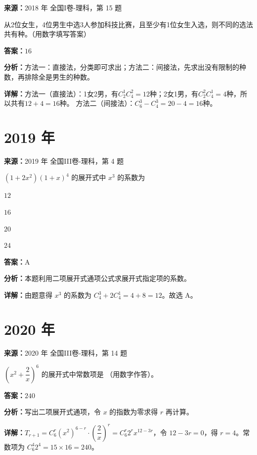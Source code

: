 \begin{question}[points=5]
\textbf{来源：}2018 年 全国I卷-理科，第 15 题\par
从2位女生，4位男生中选3人参加科技比赛，且至少有1位女生入选，则不同的选法共有种。（用数字填写答案）
\fillin[{$16$}]
\begin{solution}
\textbf{答案：}$16$

\textbf{分析：}方法一：直接法，分类即可求出；方法二：间接法，先求出没有限制的种数，再排除全是男生的种数。

\textbf{详解：}方法一（直接法）：1女2男，有$C_2^1C_4^2=12$种；2女1男，有$C_2^2C_4^1=4$种，所以共有$12+4=16$种。
方法二（间接法）：$C_6^3-C_4^3=20-4=16$种。
\end{solution}
\end{question}

\section*{2019 年}

\begin{question}[points=5]
\textbf{来源：}2019 年 全国III卷-理科，第 4 题\par
$(1+2x^2)(1+x)^4$ 的展开式中 $x^3$ 的系数为
\begin{choices}
  \item $12$
  \item $16$
  \item $20$
  \item $24$
\end{choices}
\begin{solution}
\textbf{答案：}A

\textbf{分析：}本题利用二项展开式通项公式求展开式指定项的系数。

\textbf{详解：}由题意得 $x^3$ 的系数为 $C_4^3 + 2C_4^1 = 4 + 8 = 12$。故选 A。
\end{solution}
\end{question}

\section*{2020 年}

\begin{question}[points=5]
\textbf{来源：}2020 年 全国III卷-理科，第 14 题\par
$\left(x^2+\dfrac{2}{x}\right)^6$ 的展开式中常数项是 （用数字作答）。
\fillin[{$240$}]
\begin{solution}
\textbf{答案：}$240$

\textbf{分析：}写出二项展开式通项，令 $x$ 的指数为零求得 $r$ 再计算。

\textbf{详解：}$T_{r+1}=C_6^r(x^2)^{6-r}\cdot\left(\dfrac{2}{x}\right)^r=C_6^r 2^r x^{12-3r}$，令 $12-3r=0$，得 $r=4$。常数项为 $C_6^4 2^4=15\times16=240$。
\end{solution}
\end{question}

